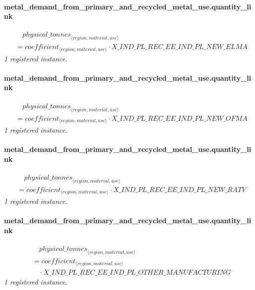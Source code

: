 \documentclass[11pt]{article}
\begin{document}
\paragraph{metal\_demand\_from\_primary\_and\_recycled\_metal\_use.quantity\_link}
\begin{align*}
&\quad {physical\_tonnes}_{\langle region, material, use\rangle}\\
&= coefficient_{\langle region, material, use\rangle} \cdot X\_IND\_PL\_REC\_EE\_IND\_PL\_NEW\_ELMA
\end{align*}
\noindent\emph{1 registered instance.}\par
\paragraph{metal\_demand\_from\_primary\_and\_recycled\_metal\_use.quantity\_link}
\begin{align*}
&\quad {physical\_tonnes}_{\langle region, material, use\rangle}\\
&= coefficient_{\langle region, material, use\rangle} \cdot X\_IND\_PL\_REC\_EE\_IND\_PL\_NEW\_OFMA
\end{align*}
\noindent\emph{1 registered instance.}\par
\paragraph{metal\_demand\_from\_primary\_and\_recycled\_metal\_use.quantity\_link}
\begin{align*}
&\quad {physical\_tonnes}_{\langle region, material, use\rangle}\\
&= coefficient_{\langle region, material, use\rangle} \cdot X\_IND\_PL\_REC\_EE\_IND\_PL\_NEW\_RATV
\end{align*}
\noindent\emph{1 registered instance.}\par
\paragraph{metal\_demand\_from\_primary\_and\_recycled\_metal\_use.quantity\_link}
\begin{align*}
&\quad {physical\_tonnes}_{\langle region, material, use\rangle}\\
&= coefficient_{\langle region, material, use\rangle}\\
&\quad {}\cdot X\_IND\_PL\_REC\_EE\_IND\_PL\_OTHER\_MANUFACTURING
\end{align*}
\noindent\emph{1 registered instance.}\par
\end{document}

